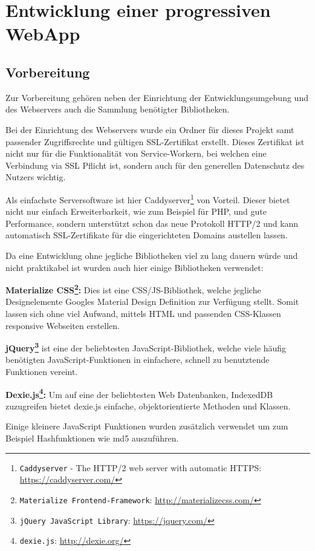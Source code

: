 \documentclass[a4paper,12pt,ngerman,listof=numbered]{scrartcl}      %
\let\oldcite\cite
\renewcommand{\cite}[1]{\textsuperscript{\oldcite{#1}}}
\newcommand{\spacer}{\par\bigskip\noindent}
\providecommand{\inlinecode}[1]{\texttt{#1}}
\begin{document}
	\section{Entwicklung einer progressiven WebApp}
	\subsection{Vorbereitung}
	Zur Vorbereitung gehören neben der Einrichtung der Entwicklungsumgebung und des Webservers auch die Sammlung benötigter Bibliotheken.\par
	Bei der Einrichtung des Webservers wurde ein Ordner für dieses Projekt samt passender Zugriffsrechte und gültigen SSL-Zertifikat erstellt. Dieses Zertifikat ist nicht nur für die Funktionalität von Service-Workern, bei welchen eine Verbindung via SSL Pflicht ist, sondern auch für den generellen Datenschutz des Nutzers wichtig.\par
	Als einfachste Serversoftware ist hier Caddyserver\footnote{\inlinecode{Caddyserver} - The HTTP/2 web server with automatic HTTPS: \url{https://caddyserver.com/}} von Vorteil. Dieser bietet nicht nur einfach Erweiterbarkeit, wie zum Beispiel für PHP, und gute Performance, sondern unterstützt schon das neue Protokoll HTTP/2 und kann automatisch SSL-Zertifikate für die eingerichteten Domains austellen lassen.\par
	\noindent Da eine Entwicklung ohne jegliche Bibliotheken viel zu lang dauern würde und nicht praktikabel ist wurden auch hier einige Bibliotheken verwendet:\par
	\spacer\textbf{Materialize CSS\footnote{\inlinecode{Materialize Frontend-Framework}: \url{http://materializecss.com/}}:} Dies ist eine CSS/JS-Bibliothek, welche jegliche Designelemente Googles Material Design Definition zur Verfügung stellt. Somit lassen sich ohne viel Aufwand, mittels HTML und passenden CSS-Klassen responsive Webseiten erstellen.\par
	\spacer\textbf{jQuery\footnote{\inlinecode{jQuery JavaScript Library}: \url{https://jquery.com/}}} ist eine der beliebtesten JavaScript-Bibliothek\cite{jQueryCoverage}, welche viele häufig be\-nö\-ti\-gten JavaScript-Funktionen in einfachere, schnell zu benutztende Funktionen vereint.\par
	\spacer\textbf{Dexie.js\footnote{\inlinecode{dexie.js}: \url{http://dexie.org/}}:} Um auf eine der beliebtesten Web Datenbanken, IndexedDB zuzugreifen bietet dexie.js einfache, objektorientierte Methoden und Klassen.\par
	\spacer Einige kleinere JavaScript Funktionen wurden zusätzlich verwendet um zum Beispiel Hashfunktionen wie md5 auszuführen.\par
	
\end{document}
